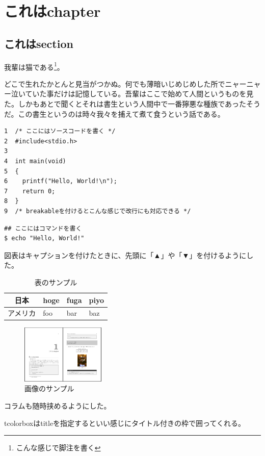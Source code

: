 \chapter{これはchapter}
\section{これはsection}
我輩は猫である\footnote{こんな感じで脚注を書く}。

どこで生れたかとんと見当がつかぬ。何でも薄暗いじめじめした所でニャーニャー泣いていた事だけは記憶している。吾輩はここで始めて人間というものを見た。しかもあとで聞くとそれは書生という人間中で一番獰悪な種族であったそうだ。この書生というのは時々我々を捕えて煮て食うという話である。

\begin{tcolorbox}[breakable]
\begin{verbatim}
1  /* ここにはソースコードを書く */
2  #include<stdio.h>
3
4  int main(void)
5  {
6    printf("Hello, World!\n");
7    return 0;
8  }
9  /* breakableを付けるとこんな感じで改行にも対応できる */
\end{verbatim}
\end{tcolorbox}

\begin{shaded}
\begin{verbatim}
## ここにはコマンドを書く
$ echo "Hello, World!"
\end{verbatim}
\end{shaded}

図表はキャプションを付けたときに、先頭に「▲」や「▼」を付けるようにした。

\begin{table}[H]
  \centering
  \caption{表のサンプル}
  \begin{tabular}{|c|l|l|l|} \hline
    日本 & hoge & fuga & piyo \\ \hline
    アメリカ & foo & bar & baz \\ \hline
  \end{tabular}
  \label{table-sample10302}
\end{table}

\begin{figure}[H]
  \centering
  \includegraphics[width=4cm]{./image/03-Tech/chap2/sample.png}
  \caption{画像のサンプル}
  \label{figure-sample10302}
\end{figure}

\begin{tcolorbox}[title=これはコラム]
  コラムも随時挟めるようにした。

  tcolorboxはtitleを指定するといい感じにタイトル付きの枠で囲ってくれる。
\end{tcolorbox}